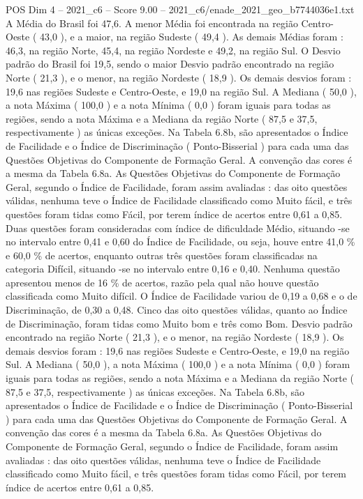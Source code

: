 \begin{textsample}{POS Dim 4 – 2021\_c6 – Score 9.00 – 2021\_c6/enade\_2021\_geo\_b7744036e1.txt}
A Média do Brasil foi 47,6.
A menor Média foi encontrada na região Centro-Oeste ( 43,0 ), e a maior, na região Sudeste ( 49,4 ).
As demais Médias foram : 46,3, na região Norte, 45,4, na região Nordeste e 49,2, na região Sul.
O Desvio padrão do Brasil foi 19,5, sendo o maior Desvio padrão encontrado na região Norte ( 21,3 ), e o menor, na região Nordeste ( 18,9 ).
Os demais desvios foram : 19,6 nas regiões Sudeste e Centro-Oeste, e 19,0 na região Sul.
A Mediana ( 50,0 ), a nota Máxima ( 100,0 ) e a nota Mínima ( 0,0 ) foram iguais para todas as regiões, sendo a nota Máxima e a Mediana da região Norte ( 87,5 e 37,5, respectivamente ) as únicas exceções.
Na Tabela 6.8b, são apresentados o Índice de Facilidade e o Índice de Discriminação ( Ponto-Bisserial ) para cada uma das Questões Objetivas do Componente de Formação Geral.
A convenção das cores é a mesma da Tabela 6.8a.
As Questões Objetivas do Componente de Formação Geral, segundo o Índice de Facilidade, foram assim avaliadas : das oito questões válidas, nenhuma teve o Índice de Facilidade classificado como Muito fácil, e três questões foram tidas como Fácil, por terem índice de acertos entre 0,61 a 0,85.
Duas questões foram consideradas com índice de dificuldade Médio, situando -se no intervalo entre 0,41 e 0,60 do Índice de Facilidade, ou seja, houve entre 41,0 \% e 60,0 \% de acertos, enquanto outras três questões foram classificadas na categoria Difícil, situando -se no intervalo entre 0,16 e 0,40.
Nenhuma questão apresentou menos de 16 \% de acertos, razão pela qual não houve questão classificada como Muito difícil.
O Índice de Facilidade variou de 0,19 a 0,68 e o de Discriminação, de 0,30 a 0,48.
Cinco das oito questões válidas, quanto ao Índice de Discriminação, foram tidas como Muito bom e três como Bom.
Desvio padrão encontrado na região Norte ( 21,3 ), e o menor, na região Nordeste ( 18,9 ).
Os demais desvios foram : 19,6 nas regiões Sudeste e Centro-Oeste, e 19,0 na região Sul.
A Mediana ( 50,0 ), a nota Máxima ( 100,0 ) e a nota Mínima ( 0,0 ) foram iguais para todas as regiões, sendo a nota Máxima e a Mediana da região Norte ( 87,5 e 37,5, respectivamente ) as únicas exceções.
Na Tabela 6.8b, são apresentados o Índice de Facilidade e o Índice de Discriminação ( Ponto-Bisserial ) para cada uma das Questões Objetivas do Componente de Formação Geral.
A convenção das cores é a mesma da Tabela 6.8a.
As Questões Objetivas do Componente de Formação Geral, segundo o Índice de Facilidade, foram assim avaliadas : das oito questões válidas, nenhuma teve o Índice de Facilidade classificado como Muito fácil, e três questões foram tidas como Fácil, por terem índice de acertos entre 0,61 a 0,85.

\end{textsample}

